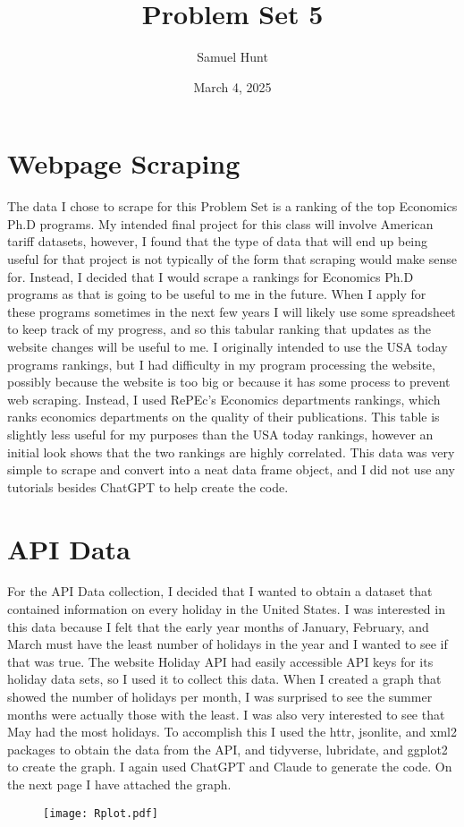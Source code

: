 \documentclass{article}
\title{Problem Set 5}
\author{Samuel Hunt}
\date{March 4, 2025}
\begin{document}
\maketitle

\section{Webpage Scraping}
The data I chose to scrape for this Problem Set is a ranking of the top Economics Ph.D programs. My intended final project for this class will involve American tariff datasets, however, I found that the type of data that will end up being useful for that project is not typically of the form that scraping would make sense for. Instead, I decided that I would scrape a rankings for Economics Ph.D programs as that is going to be useful to me in the future. When I apply for these programs sometimes in the next few years I will likely use some spreadsheet to keep track of my progress, and so this tabular ranking that updates as the website changes will be useful to me. I originally intended to use the USA today programs rankings, but I had difficulty in my program processing the website, possibly because the website is too big or because it has some process to prevent web scraping. Instead, I used RePEc's Economics departments rankings, which ranks economics departments on the quality of their publications. This table is slightly less useful for my purposes than the USA today rankings, however an initial look shows that the two rankings are highly correlated. This data was very simple to scrape and convert into a neat data frame object, and I did not use any tutorials besides ChatGPT to help create the code.

\section{API Data}
For the API Data collection, I decided that I wanted to obtain a dataset that contained information on every holiday in the United States. I was interested in this data because I felt that the early year months of January, February, and March must have the least number of holidays in the year and I wanted to see if that was true. The website Holiday API had easily accessible API keys for its holiday data sets, so I used it to collect this data. When I created a graph that showed the number of holidays per month, I was surprised to see the summer months were actually those with the least. I was also very interested to see that May had the most holidays. To accomplish this I used the httr, jsonlite, and xml2 packages to obtain the data from the API, and tidyverse, lubridate, and ggplot2 to create the graph. I again used ChatGPT and Claude to generate the code. On the next page I have attached the graph.
\begin{figure}
    \centering
    \texttt{[image: Rplot.pdf]}
    \label{fig:enter-label}
\end{figure}
\end{document}
